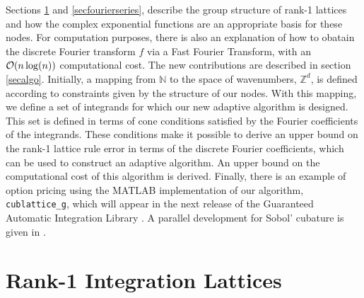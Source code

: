 \documentclass[graybox]{svmult}
\newcommand{\Z}{\mathbb{Z}} %
\newcommand{\N}{\mathbb{N}} %
\begin{document}
Sections \ref{secrank1lat} and \ref{secfourierseries}, describe the group structure of rank-1 lattices and how the complex exponential functions are an appropriate basis for these nodes. For computation purposes, there is also an explanation of how to obatain the discrete Fourier transform $f$ via a Fast Fourier Transform, with an $\mathcal{O}(n \log(n))$ computational cost.  The new contributions are described in section \ref{secalgo}. Initially, a mapping from $\N$ to the space of wavenumbers, $\Z^d$, is defined according to constraints given by the structure of our nodes. With this mapping, we define a set of integrands for which our new adaptive algorithm is designed.  This set is defined in terms of cone conditions satisfied by the Fourier coefficients of the integrands. These conditions make it possible to derive an upper bound on the rank-1 lattice rule error in terms of the discrete Fourier coefficients, which can be used to construct an adaptive algorithm.  An upper bound on the computational cost of this algorithm is derived. Finally, there is an example of option pricing using the MATLAB implementation of our algorithm, \texttt{cublattice\_g}, which will appear in the next release of the Guaranteed Automatic Integration Library \cite{ChoEtal14a}.  A parallel development for Sobol' cubature is given in \cite{HicJim16a}.

\section{Rank-1 Integration Lattices}\label{secrank1lat}
\end{document}
